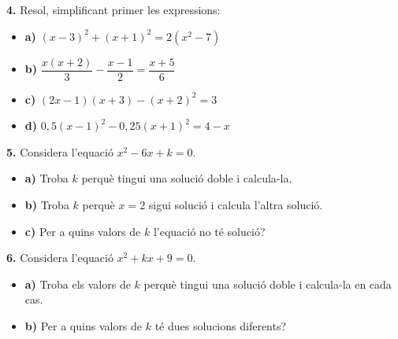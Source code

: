 \documentclass[13pt,a4paper]{extarticle}
\begin{document}
\par\noindent\begin{minipage}{\linewidth}
\textbf{4.} Resol, simplificant primer les expressions:\par

\begin{itemize}[leftmargin=0pt,itemsep=6pt,topsep=4pt,parsep=0pt,label={}]
\item \textbf{a)} $(x-3)^2+(x+1)^2=2(x^2-7)$
\item \textbf{b)} $\dfrac{x(x+2)}{3}-\dfrac{x-1}{2}=\dfrac{x+5}{6}$
\item \textbf{c)} $(2x-1)(x+3)-(x+2)^2=3$
\item \textbf{d)} $0{,}5(x-1)^2-0{,}25(x+1)^2=4-x$
\end{itemize}
\end{minipage}\par\vspace{1.6mm}
\par\noindent\begin{minipage}{\linewidth}
\textbf{5.} Considera l'equació $x^2-6x+k=0$.\par

\begin{itemize}[leftmargin=0pt,itemsep=6pt,topsep=4pt,parsep=0pt,label={}]
\item \textbf{a)} Troba $k$ perquè tingui una solució doble i calcula-la.
\item \textbf{b)} Troba $k$ perquè $x=2$ sigui solució i calcula l'altra solució.
\item \textbf{c)} Per a quins valors de $k$ l'equació no té solució?
\end{itemize}
\end{minipage}\par\vspace{1.6mm}
\par\noindent\begin{minipage}{\linewidth}
\textbf{6.} Considera l'equació $x^2+kx+9=0$.\par

\begin{itemize}[leftmargin=0pt,itemsep=6pt,topsep=4pt,parsep=0pt,label={}]
\item \textbf{a)} Troba els valors de $k$ perquè tingui una solució doble i calcula-la en cada cas.
\item \textbf{b)} Per a quins valors de $k$ té dues solucions diferents?
\end{itemize}
\end{minipage}\par\vspace{1.6mm}
\end{document}
